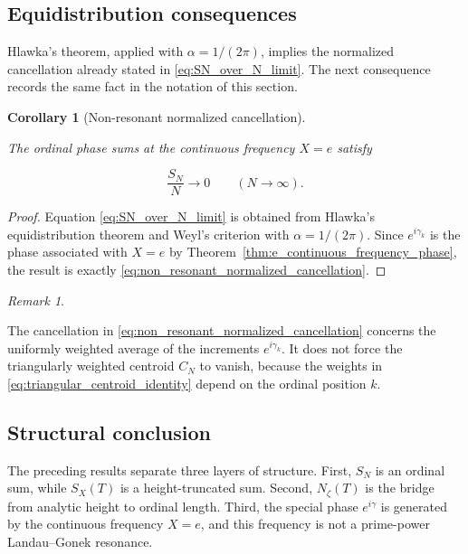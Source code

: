\documentclass[11pt]{amsart}
\numberwithin{equation}{section}
\theoremstyle{plain}
\newtheorem{corollary}[theorem]{Corollary}
\theoremstyle{definition}
\theoremstyle{remark}
\newtheorem{remark}[theorem]{Remark}
\begin{document}
\subsection{Equidistribution consequences}
\label{subsec:equidistribution_consequences_non_resonant}

Hlawka's theorem, applied with \(\alpha=1/(2\pi)\), implies the
normalized cancellation already stated in \eqref{eq:SN_over_N_limit}.
The next consequence records the same fact in the notation of this
section.

\begin{corollary}[Non-resonant normalized cancellation]
\label{cor:non_resonant_normalized_cancellation}

The ordinal phase sums at the continuous frequency \(X=e\) satisfy

\begin{equation}
\frac{S_N}{N}\longrightarrow 0
\qquad
(N\to\infty).
\label{eq:non_resonant_normalized_cancellation}
\end{equation}

\end{corollary}

\begin{proof}
Equation \eqref{eq:SN_over_N_limit} is obtained from Hlawka's
equidistribution theorem and Weyl's criterion with
\(\alpha=1/(2\pi)\). Since \(e^{i\gamma_k}\) is the phase associated with
\(X=e\) by Theorem~\ref{thm:e_continuous_frequency_phase}, the result is
exactly \eqref{eq:non_resonant_normalized_cancellation}.
\end{proof}

\begin{remark}
\label{rem:centroid_not_forced_by_equidistribution}

The cancellation in \eqref{eq:non_resonant_normalized_cancellation}
concerns the uniformly weighted average of the increments
\(e^{i\gamma_k}\). It does not force the triangularly weighted centroid
\(C_N\) to vanish, because the weights in
\eqref{eq:triangular_centroid_identity} depend on the ordinal position
\(k\).
\end{remark}

\subsection{Structural conclusion}
\label{subsec:structural_conclusion_non_resonant}

The preceding results separate three layers of structure. First,
\(S_N\) is an ordinal sum, while \(S_X(T)\) is a height-truncated sum.
Second, \(N_\zeta(T)\) is the bridge from analytic height to ordinal
length. Third, the special phase \(e^{i\gamma}\) is generated by the
continuous frequency \(X=e\), and this frequency is not a prime-power
Landau--Gonek resonance.
\end{document}
